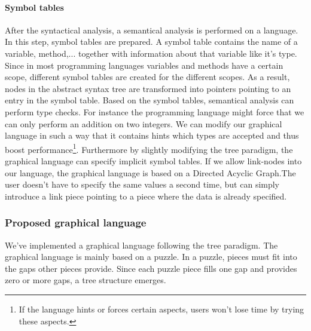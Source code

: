 \paragraph{Symbol tables}
After the syntactical analysis, a semantical analysis is performed on a
language. In this step, symbol tables are prepared. A symbol table contains the
name of a variable, method,... together with information about that variable
like it's type. Since in most programming languages variables and methods have
a certain scope, different symbol tables are created for the different scopes.
As a result, nodes in the abstract syntax tree are transformed into pointers
pointing to an entry in the symbol table. Based on the symbol tables,
semantical analysis can perform type checks. For instance the programming
language might force that we can only perform an addition on two integers. We
can modify our graphical language in such a way that it contains hints which
types are accepted and thus boost performance\footnote{If the language hints
or forces certain aspects, users won't lose time by trying these aspects.}.
Furthermore by slightly modifying the tree paradigm, the graphical language can
specify implicit symbol tables. If we allow link-nodes into our language, the
graphical language is based on a Directed Acyclic Graph.The user doesn't have to
specify the same values a second time, but can simply introduce a link
piece pointing to a piece where the data is already specified.
\subsubsection{Proposed graphical language}
We've implemented a graphical language following the tree paradigm. The
graphical language is mainly based on a puzzle. In a puzzle, pieces must fit
into the gaps other pieces provide. Since each puzzle piece fills one gap and
provides zero or more gaps, a tree structure emerges.
